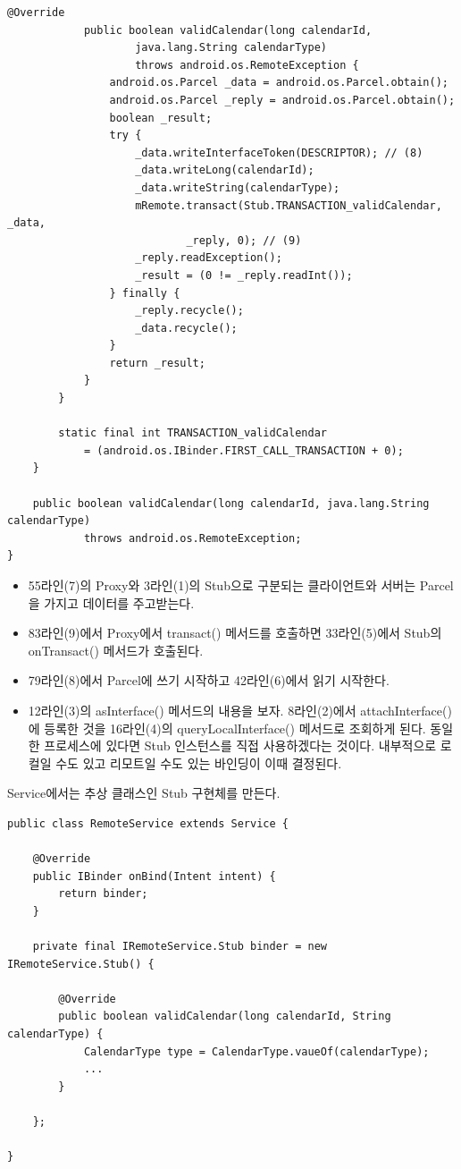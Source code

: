 \begin{lstlisting}[frame=single]
			@Override
			public boolean validCalendar(long calendarId,
					java.lang.String calendarType)
					throws android.os.RemoteException {
				android.os.Parcel _data = android.os.Parcel.obtain();
				android.os.Parcel _reply = android.os.Parcel.obtain();
				boolean _result;
				try {
					_data.writeInterfaceToken(DESCRIPTOR); // (8)
					_data.writeLong(calendarId);
					_data.writeString(calendarType);
					mRemote.transact(Stub.TRANSACTION_validCalendar, _data, 
							_reply, 0); // (9)
					_reply.readException();
					_result = (0 != _reply.readInt());
				} finally {
					_reply.recycle();
					_data.recycle();
				}
				return _result;
			}
		}

		static final int TRANSACTION_validCalendar 
			= (android.os.IBinder.FIRST_CALL_TRANSACTION + 0);
	}

	public boolean validCalendar(long calendarId, java.lang.String calendarType)
			throws android.os.RemoteException;
}
\end{lstlisting}
\begin{itemize}
\item 55라인(7)의 Proxy와 3라인(1)의 Stub으로 구분되는 클라이언트와 서버는 Parcel을 가지고 데이터를 주고받는다. 
\item 83라인(9)에서 Proxy에서 transact() 메서드를 호출하면 33라인(5)에서 Stub의 onTransact() 메서드가 호출된다.
\item 79라인(8)에서 Parcel에 쓰기 시작하고 42라인(6)에서 읽기 시작한다.
\item 12라인(3)의 asInterface() 메서드의 내용을 보자. 8라인(2)에서 attachInterface()에 등록한 것을 16라인(4)의 queryLocalInterface() 메서드로 조회하게 된다. 동일한 프로세스에 있다면 Stub 인스턴스를 직접 사용하겠다는 것이다. 내부적으로 로컬일 수도 있고 리모트일 수도 있는 바인딩이 이때 결정된다.
\end{itemize}

Service에서는 추상 클래스인 Stub 구현체를 만든다.
\begin{lstlisting}[frame=single]
public class RemoteService extends Service {

 	@Override
    public IBinder onBind(Intent intent) {
		return binder;
	}
    	
	private final IRemoteService.Stub binder = new IRemoteService.Stub() {
	
		@Override
        public boolean validCalendar(long calendarId, String calendarType) {
			CalendarType type = CalendarType.vaueOf(calendarType);
            ...
        }
        
    }; 
    
}       	
\end{lstlisting}

